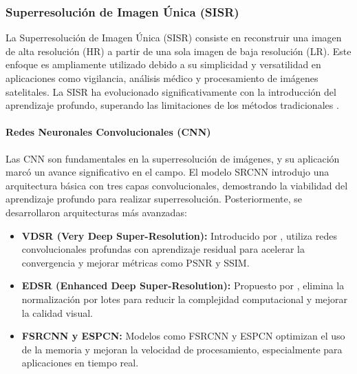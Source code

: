         \subsubsection{Superresolución de Imagen Única (SISR)}

            La Superresolución de Imagen Única (SISR) consiste en reconstruir una imagen de alta resolución (HR) a partir de una sola imagen de baja resolución (LR). Este enfoque es ampliamente utilizado debido a su simplicidad y versatilidad en aplicaciones como vigilancia, análisis médico y procesamiento de imágenes satelitales. La SISR ha evolucionado significativamente con la introducción del aprendizaje profundo, superando las limitaciones de los métodos tradicionales \textcite{anwar2020deep}.
            
            \paragraph{Redes Neuronales Convolucionales (CNN)}
            
                Las CNN son fundamentales en la superresolución de imágenes, y su aplicación marcó un avance significativo en el campo. El modelo SRCNN \textcite{dong2014learning, dong2015image} introdujo una arquitectura básica con tres capas convolucionales, demostrando la viabilidad del aprendizaje profundo para realizar superresolución. Posteriormente, se desarrollaron arquitecturas más avanzadas:
            
                \begin{itemize}
                    \item \textbf{VDSR (Very Deep Super-Resolution):} Introducido por \textcite{kim2016accurate}, utiliza redes convolucionales profundas con aprendizaje residual para acelerar la convergencia y mejorar métricas como PSNR y SSIM.
                    \item \textbf{EDSR (Enhanced Deep Super-Resolution):} Propuesto por \textcite{lim2017enhanced}, elimina la normalización por lotes para reducir la complejidad computacional y mejorar la calidad visual.
                    \item \textbf{FSRCNN y ESPCN:} Modelos como FSRCNN \textcite{dong2016accelerating} y ESPCN \textcite{shi2016real} optimizan el uso de la memoria y mejoran la velocidad de procesamiento, especialmente para aplicaciones en tiempo real.
                \end{itemize}
                      
